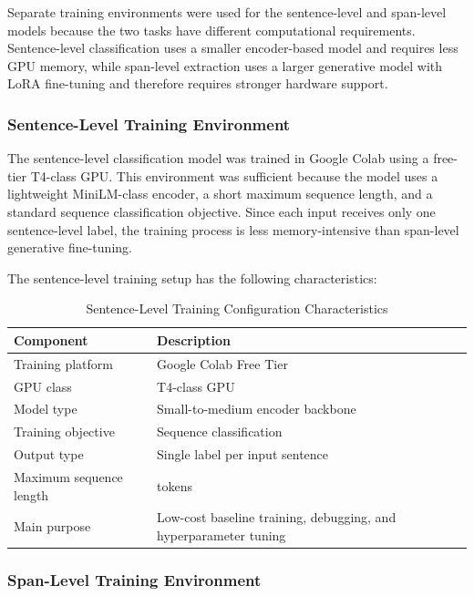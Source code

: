 \documentclass[12pt,oneside,openright,a4paper]{cpe-english-project}
\begin{document}
Separate training environments were used for the sentence-level and span-level models because the two tasks have different computational requirements. Sentence-level classification uses a smaller encoder-based model and requires less GPU memory, while span-level extraction uses a larger generative model with LoRA fine-tuning and therefore requires stronger hardware support.

\subsubsection{Sentence-Level Training Environment}

The sentence-level classification model was trained in Google Colab using a free-tier T4-class GPU. This environment was sufficient because the model uses a lightweight MiniLM-class encoder, a short maximum sequence length, and a standard sequence classification objective. Since each input receives only one sentence-level label, the training process is less memory-intensive than span-level generative fine-tuning.

The sentence-level training setup has the following characteristics:

\begin{table}[H]
\centering
\small
\caption{Sentence-Level Training Configuration Characteristics}
\begin{tabularx}{\textwidth}{@{}>{\raggedright\arraybackslash}p{}>{\raggedright\arraybackslash}X@{}}
\toprule
\textbf{Component} & \textbf{Description} \\
\midrule
Training platform & Google Colab Free Tier \\
GPU class & T4-class GPU \\
Model type & Small-to-medium encoder backbone \\
Training objective & Sequence classification \\
Output type & Single label per input sentence \\
Maximum sequence length & 128 tokens \\
Main purpose & Low-cost baseline training, debugging, and hyperparameter tuning \\
\bottomrule
\end{tabularx}
\end{table}

\subsubsection{Span-Level Training Environment}
\end{document}
